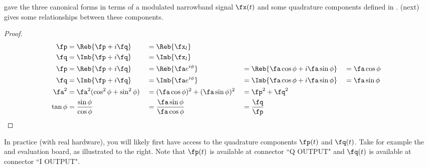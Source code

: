  gave the three canonical forms  in terms of a
modulated narrowband signal $\fx(t)$ and some quadrature components defined in .
 (next) gives some relationships between these components.
\begin{proposition}
\label{prop:canforms_quad}
\end{proposition}
\begin{proof}
\begin{align*}
   \fp
     &=  \Reb{\fp + i\fq}
    &&=  \Reb{\fx_l}
\\
   \fq
     &=  \Imb{\fp + i\fq}
    &&=  \Imb{\fx_l}
\\
   \fp
     &= \Reb{\fp + i\fq}
    &&= \Reb{\fa e^{i\phi}}
    &&= \Reb{\fa\cos\phi + i\fa\sin\phi}
    &&= \fa\cos\phi
\\
   \fq
     &= \Imb{\fp + i\fq}
    &&= \Imb{\fa e^{i\phi}}
    &&= \Imb{\fa\cos\phi + i\fa\sin\phi}
    &&= \fa\sin\phi
\\
   \fa^2
     &= \fa^2 (\cos^2\phi + \sin^2\phi)
    &&= (\fa \cos\phi)^2 + (\fa\sin\phi)^2
    &&= \fp^2 + \fq^2
\\
   \tan\phi
     &= \frac{\sin\phi}{\cos\phi}
    &&= \frac{\fa\sin\phi}{\fa\cos\phi}
    &&= \frac{\fq}{\fp}
\end{align*}
\end{proof}

\begin{minipage}{\tw-60mm}
\begin{remark}
In practice (with real hardware), you will likely first have access to
the quadrature components $\fp(t)$ and $\fq(t)$.
Take for example the  and
evaluation board, as illustrated to the right.\footnotemark
Note that  $\fp(t)$ is available at connector ``Q OUTPUT"
     and      $\fq(t)$ is available at connector ``I OUTPUT".
\end{remark}
\end{minipage}\hfill{}

